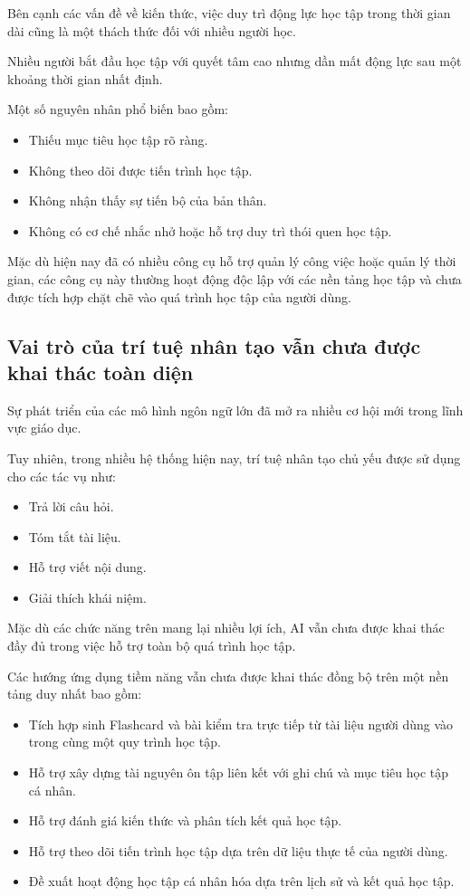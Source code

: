 Bên cạnh các vấn đề về kiến thức, việc duy trì động lực học tập trong thời gian dài cũng là một thách thức đối với nhiều người học.

Nhiều người bắt đầu học tập với quyết tâm cao nhưng dần mất động lực sau một khoảng thời gian nhất định.

Một số nguyên nhân phổ biến bao gồm:
\begin{itemize}
    \item Thiếu mục tiêu học tập rõ ràng.
    \item Không theo dõi được tiến trình học tập.
    \item Không nhận thấy sự tiến bộ của bản thân.
    \item Không có cơ chế nhắc nhở hoặc hỗ trợ duy trì thói quen học tập.
\end{itemize}

Mặc dù hiện nay đã có nhiều công cụ hỗ trợ quản lý công việc hoặc quản lý thời gian, các công cụ này thường hoạt động độc lập với các nền tảng học tập và chưa được tích hợp chặt chẽ vào quá trình học tập của người dùng.

\subsection{Vai trò của trí tuệ nhân tạo vẫn chưa được khai thác toàn diện}

Sự phát triển của các mô hình ngôn ngữ lớn đã mở ra nhiều cơ hội mới trong lĩnh vực giáo dục.

Tuy nhiên, trong nhiều hệ thống hiện nay, trí tuệ nhân tạo chủ yếu được sử dụng cho các tác vụ như:
\begin{itemize}
    \item Trả lời câu hỏi.
    \item Tóm tắt tài liệu.
    \item Hỗ trợ viết nội dung.
    \item Giải thích khái niệm.
\end{itemize}

Mặc dù các chức năng trên mang lại nhiều lợi ích, AI vẫn chưa được khai thác đầy đủ trong việc hỗ trợ toàn bộ quá trình học tập.

Các hướng ứng dụng tiềm năng vẫn chưa được khai thác đồng bộ trên một nền tảng duy nhất bao gồm:
\begin{itemize}
    \item Tích hợp sinh Flashcard và bài kiểm tra trực tiếp từ tài liệu người dùng vào trong cùng một quy trình học tập.
    \item Hỗ trợ xây dựng tài nguyên ôn tập liên kết với ghi chú và mục tiêu học tập cá nhân.
    \item Hỗ trợ đánh giá kiến thức và phân tích kết quả học tập.
    \item Hỗ trợ theo dõi tiến trình học tập dựa trên dữ liệu thực tế của người dùng.
    \item Đề xuất hoạt động học tập cá nhân hóa dựa trên lịch sử và kết quả học tập.
\end{itemize}

